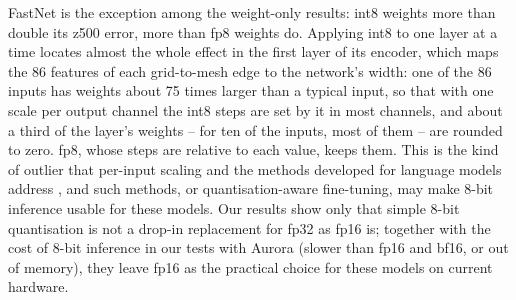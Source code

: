 FastNet is the exception among the weight-only results: int8
weights more than double its z500 error, more than fp8 weights do.
Applying int8 to one layer at a time locates almost the whole effect in
the first layer of its encoder, which maps the 86 features of each
grid-to-mesh edge to the network's width: one of the 86 inputs has
weights about 75 times larger than a typical input, so that with one
scale per output channel the int8 steps are set by it in most channels, and about a third
of the layer's weights -- for ten of the inputs, most of them -- are
rounded to zero. fp8, whose steps are relative to each value, keeps them.
This is the kind of outlier that per-input scaling and the methods
developed for language models address
\citep{dettmers2022llmint8, xiao2022smoothquant}, and such methods, or
quantisation-aware fine-tuning, may make 8-bit inference usable for these
models. Our results show only that simple 8-bit quantisation is not a
drop-in replacement for fp32 as fp16 is; together with the cost of 8-bit
inference in our tests with Aurora (slower than fp16 and bf16, or out of
memory), they leave fp16 as the
practical choice for these models on current hardware.
